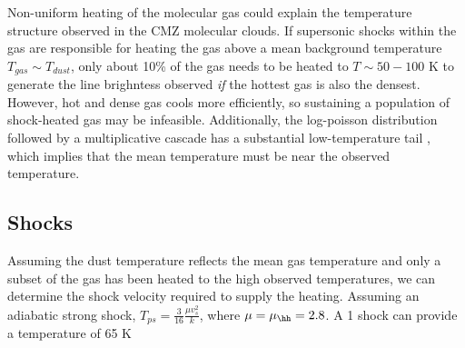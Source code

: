 Non-uniform heating of the molecular gas could explain the temperature
structure observed in the CMZ molecular clouds.  If supersonic shocks within
the gas are responsible for heating the gas above a mean background temperature
$T_{gas} \sim T_{dust}$, only about 10\% of the gas needs to be heated to
$T\sim50-100$ K to generate the line brighntess observed \emph{if} the hottest
gas is also the densest.  However, hot and dense gas cools more efficiently, so
sustaining a population of shock-heated gas may be infeasible.  Additionally,
the log-poisson distribution followed by a multiplicative cascade has a substantial
low-temperature tail \citep{Pan2009a}, which implies that the mean temperature
must be near the observed temperature.




\subsection{Shocks}
Assuming the dust temperature reflects the mean gas temperature and only a subset
of the gas has been heated to the high observed temperatures, we can determine the
shock velocity required to supply the heating.  Assuming an adiabatic strong shock,
$T_{ps} = \frac{3}{16}\frac{\mu v_s^2}{k}$, where $\mu = \mu_{\hh} = 2.8$.  A 1 \kms
shock can provide a temperature of 65 K

